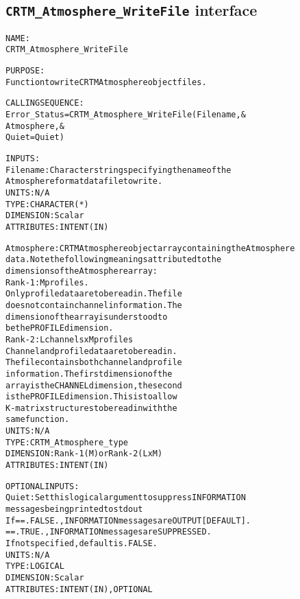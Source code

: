 \subsection{\texttt{CRTM\_Atmosphere\_WriteFile} interface}
  \label{sec:CRTM_Atmosphere_WriteFile_interface}
  \begin{alltt}
 
  NAME:
        CRTM_Atmosphere_WriteFile
 
  PURPOSE:
        Function to write CRTM Atmosphere object files.
 
  CALLING SEQUENCE:
        Error_Status = CRTM_Atmosphere_WriteFile( Filename     , &
                                                  Atmosphere   , &
                                                  Quiet = Quiet  )
 
  INPUTS:
        Filename:     Character string specifying the name of the
                      Atmosphere format data file to write.
                      UNITS:      N/A
                      TYPE:       CHARACTER(*)
                      DIMENSION:  Scalar
                      ATTRIBUTES: INTENT(IN)
 
        Atmosphere:   CRTM Atmosphere object array containing the Atmosphere
                      data. Note the following meanings attributed to the
                      dimensions of the Atmosphere array:
                      Rank-1: M profiles.
                              Only profile data are to be read in. The file
                              does not contain channel information. The
                              dimension of the array is understood to
                              be the PROFILE dimension.
                      Rank-2: L channels  x  M profiles
                              Channel and profile data are to be read in.
                              The file contains both channel and profile
                              information. The first dimension of the 
                              array is the CHANNEL dimension, the second
                              is the PROFILE dimension. This is to allow
                              K-matrix structures to be read in with the
                              same function.
                      UNITS:      N/A
                      TYPE:       CRTM_Atmosphere_type
                      DIMENSION:  Rank-1 (M) or Rank-2 (L x M)
                      ATTRIBUTES: INTENT(IN)
 
  OPTIONAL INPUTS:
        Quiet:        Set this logical argument to suppress INFORMATION
                      messages being printed to stdout
                      If == .FALSE., INFORMATION messages are OUTPUT [DEFAULT].
                         == .TRUE.,  INFORMATION messages are SUPPRESSED.
                      If not specified, default is .FALSE.
                      UNITS:      N/A
                      TYPE:       LOGICAL
                      DIMENSION:  Scalar
                      ATTRIBUTES: INTENT(IN), OPTIONAL
 

\end{alltt}
